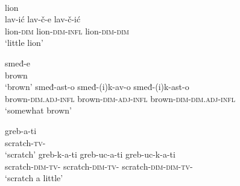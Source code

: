 \documentclass[output=paper,colorlinks,citecolor=brown]{langscibook}
\begin{document}
    
    


\ea\label{str:ex:diminutive1}
  \ea \label{str:ex:dim-noun} 
    \ea {} \\ 
    lion \\ 
    \ex \gll lav-ić lav-č-e lav-č-ić\\ 
     lion-\textsc{dim} lion-\textsc{dim-infl} lion-\textsc{dim-dim}\\ 
    \glt `little lion'
    \z

  \ex \label{str:ex:dim-adj}
    \ea\gll smeđ-e\\ 
    brown \\
    \glt `brown'
    \ex\gll smeđ-ast-o smeđ-(i)k-av-o smeđ-(i)k-ast-o\\ 
    brown-\textsc{dim.adj-infl} brown-\textsc{dim-adj-infl} brown-\textsc{dim-dim.adj-infl}\\
    \glt `somewhat brown'
    \z

  \ex \label{str:ex:dim-verb} 
    \ea\gll greb-a-ti\\ 
    scratch-\textsc{tv}-{\INF}\\
    \glt `scratch'
    \ex\gll greb-k-a-ti greb-uc-a-ti greb-uc-k-a-ti\\ 
    scratch-\textsc{dim-tv}-{\INF} scratch-\textsc{dim-tv}-{\INF} scratch-\textsc{dim-dim-tv}-{\INF}\\
    \glt `scratch a little'
    \z
  \z
\z
\end{document}
